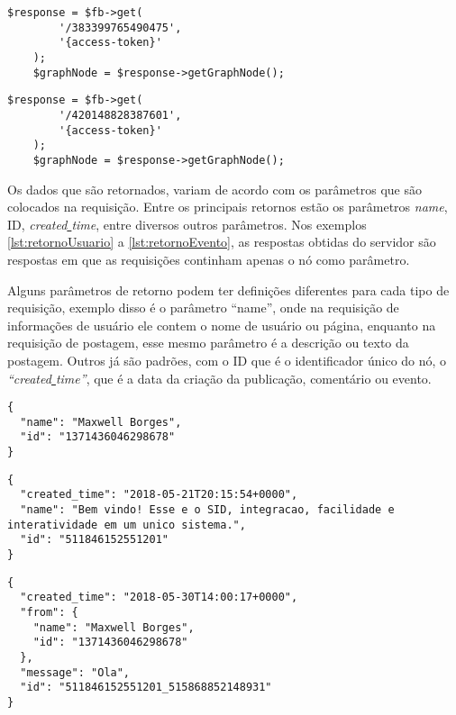 \begin{lstlisting}[caption={Requisitar uma evento específico},label={lst:evento}]
	$response = $fb->get(
    	'/383399765490475',
    	'{access-token}'
	);
	$graphNode = $response->getGraphNode();
\end{lstlisting}

\begin{lstlisting}[caption={Requisitar uma álbum específico},label={lst:album}]
	$response = $fb->get(
		'/420148828387601',
		'{access-token}'
	);
	$graphNode = $response->getGraphNode();
\end{lstlisting}

Os dados que são retornados, variam de acordo com os parâmetros que são colocados na requisição. Entre os principais retornos estão os parâmetros \textit{name}, ID, \textit{created\underline{{ }}time}, entre diversos outros parâmetros. Nos exemplos \ref{lst:retornoUsuario} a \ref{lst:retornoEvento}, as respostas obtidas do servidor são respostas em que as requisições continham apenas o nó como parâmetro.  

Alguns parâmetros de retorno podem ter definições diferentes para cada tipo de requisição, exemplo disso é o parâmetro ``name'', onde na requisição de informações de usuário ele contem o nome de usuário ou página, enquanto na requisição de postagem, esse mesmo parâmetro é a descrição ou texto da postagem. Outros já são padrões, com o ID que é o identificador único do nó, o \textit{``created\underline{{ }}time''}, que é a data da criação da publicação, comentário ou evento.

\begin{lstlisting}[caption={Resposta do servidor as requisições \ref{lst:usuario}, \ref{lst:me} e \ref{lst:pagina} (Usuário e Página)},label={lst:retornoUsuario}]
{
  "name": "Maxwell Borges",
  "id": "1371436046298678"
}
\end{lstlisting}

\begin{lstlisting}[caption={Resposta do servidor a uma requisição \ref{lst:postagem} (Postagem)},label={lst:retornoPostagem}]
{
  "created_time": "2018-05-21T20:15:54+0000",
  "name": "Bem vindo! Esse e o SID, integracao, facilidade e interatividade em um unico sistema.",
  "id": "511846152551201"
}
\end{lstlisting}

\begin{lstlisting}[caption={Resposta do servidor a uma requisição \ref{lst:comentario} (Comentário)},label={lst:retornoComentario}]
{
  "created_time": "2018-05-30T14:00:17+0000",
  "from": {
    "name": "Maxwell Borges",
    "id": "1371436046298678"
  },
  "message": "Ola",
  "id": "511846152551201_515868852148931"
}
\end{lstlisting}

